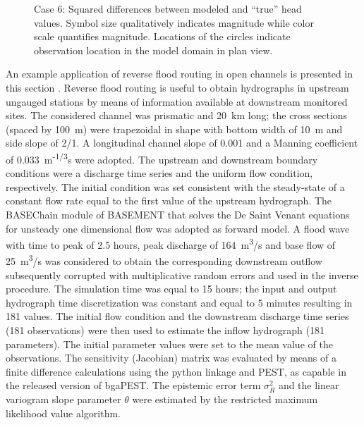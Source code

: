 \documentclass[11pt,oneside,onecolumn]{usgsreport}
\begin{document}
\begin{appendix}
\begin{figure}[H]
\caption{\label{fig:3Lresid_case6}Case 6: Squared differences between modeled
and ``true'' head values. Symbol size qualitatively indicates magnitude
while color scale quantifies magnitude. Locations of the circles indicate
observation location in the model domain in plan view.}
\end{figure}




An example application of reverse flood routing in open channels is
presented in this section \citep{doriareverserouting}. Reverse flood
routing is useful to obtain hydrographs in upstream ungauged stations
by means of information available at downstream monitored sites. The
considered channel was prismatic and 20~km long; the cross sections
(spaced by 100~m) were trapezoidal in shape with bottom width of
10~m and side slope of 2/1. A longitudinal channel slope of 0.001
and a Manning coefficient of 0.033~m\textsuperscript{-1/3}s were
adopted. The upstream and downstream boundary conditions were a discharge
time series and the uniform flow condition, respectively. The initial
condition was set consistent with the steady-state of a constant flow
rate equal to the first value of the upstream hydrograph. The BASEChain
module of BASEMENT \citep{Basement} that solves the De Saint Venant
equations for unsteady one dimensional flow was adopted as forward
model. A flood wave with time to peak of 2.5 hours, peak discharge
of 164~m\textsuperscript{3}/s and base flow of 25~m\textsuperscript{3}/s
was considered to obtain the corresponding downstream outflow subsequently
corrupted with multiplicative random errors and used in the inverse
procedure. The simulation time was equal to 15 hours; the input and
output hydrograph time discretization was constant and equal to 5
minutes resulting in 181 values. The initial flow condition and the
downstream discharge time series (181 observations) were then used
to estimate the inflow hydrograph (181 parameters). The initial parameter
values were set to the mean value of the observations. The sensitivity
(Jacobian) matrix was evaluated by means of a finite difference calculations
using the python linkage and PEST, as capable in the released version
of bgaPEST. The epistemic error term $\sigma_{R}^{2}$ and the linear
variogram slope parameter $\theta$ were estimated by the restricted
maximum likelihood value algorithm. 


\end{appendix}
\end{document}
